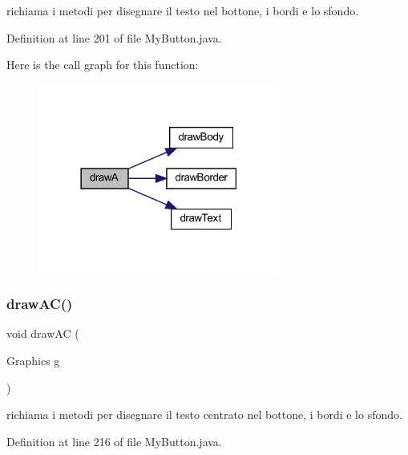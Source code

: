richiama i metodi per disegnare il testo nel bottone, i bordi e lo sfondo. 



Definition at line 201 of file My\+Button.\+java.

Here is the call graph for this function\+:\nopagebreak
\begin{figure}[H]
\begin{center}
\leavevmode
\includegraphics[width=225pt]{classui_1_1_my_button_a73a12c436143ada4de08e87bb3513ab1_cgraph}
\end{center}
\end{figure}
\mbox{\label{classui_1_1_my_button_aa8318788e7f26fedd7bfbdd0b654ad45}} 
\subsubsection{\texorpdfstring{draw\+A\+C()}{drawAC()}}
{\footnotesize\ttfamily void draw\+AC (\begin{DoxyParamCaption}\item[{Graphics}]{g }\end{DoxyParamCaption})}



richiama i metodi per disegnare il testo centrato nel bottone, i bordi e lo sfondo. 



Definition at line 216 of file My\+Button.\+java.

